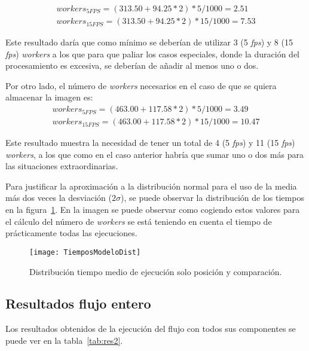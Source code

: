 {\begin{equation}
\begin{split}
workers_{5FPS} = (313.50 + 94.25*2)*5/1000 = 2.51\\
workers_{15FPS} = (313.50 + 94.25*2)*15/1000 = 7.53
\end{split}
\end{equation}

Este resultado daría que como mínimo se deberían de utilizar 3 (5 \textit{fps}) y 8 (15 \textit{fps}) \textit{workers} a los que para que paliar los casos especiales, donde la duración del procesamiento es excesiva, se deberían de añadir al menos uno o dos.

Por otro lado, el número de \textit{workers} necesarios en el caso de que se quiera almacenar la imagen es:
\begin{equation}
\begin{split}
workers_{5FPS} = (463.00 + 117.58*2)*5/1000 = 3.49\\
workers_{15FPS} = (463.00 + 117.58*2)*15/1000 = 10.47
\end{split}
\end{equation}

Este resultado muestra la necesidad de tener un total de 4 (5 \textit{fps}) y 11 (15 \textit{fps}) \textit{workers}, a los que como en el caso anterior habría que sumar uno o dos más para las situaciones extraordinarias.

Para justificar la aproximación a la distribución normal para el uso de la media más dos veces la desviación ($2\sigma$), se puede observar la distribución de los tiempos en la figura~\ref{fig:dist1}. En la imagen se puede observar como cogiendo estos valores para el cálculo del número de \textit{workers} se está teniendo en cuenta el tiempo de prácticamente todas las ejecuciones.

\begin{figure}[h]
	\centering
	\texttt{[image: TiemposModeloDist]}
	\caption{Distribución tiempo medio de ejecución solo posición y comparación.}
	\label{fig:dist1}
\end{figure}

\subsection{Resultados flujo entero}
Los resultados obtenidos de la ejecución del flujo con todos sus componentes se puede ver en la tabla~\ref{tab:res2}.

}
